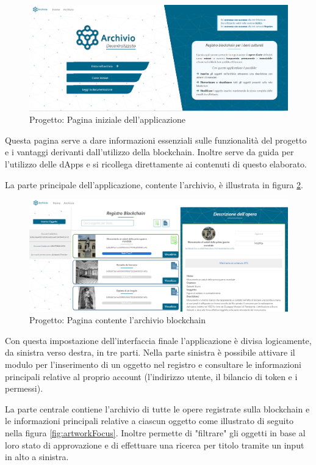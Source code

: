 \begin{figure}[H]
\centering
\includegraphics[width=1\textwidth]{immagini/prova3Index.PNG}
\caption{Progetto: Pagina iniziale dell'applicazione}
\label{fig:indexApp}
\end{figure}

Questa pagina serve a dare informazioni essenziali sulle funzionalità del progetto e i vantaggi derivanti dall'utilizzo della blockchain. Inoltre serve da guida per l'utilizzo delle dApps e si ricollega direttamente ai contenuti di questo elaborato.

La parte principale dell'applicazione, contente l'archivio, è illustrata in figura \ref{fig:artworkApp}.

\begin{figure}[H]
\centering
\includegraphics[width=1\textwidth]{immagini/artwork3Prova.PNG}
\caption{Progetto: Pagina contente l'archivio blockchain}
\label{fig:artworkApp}
\end{figure}

Con questa impostazione dell'interfaccia finale l'applicazione è divisa logicamente, da sinistra verso destra, in tre parti. Nella parte sinistra è possibile attivare il modulo per l'inserimento di un oggetto nel registro e consultare le informazioni principali relative al proprio account (l'indirizzo utente, il bilancio di token e i permessi). 

La parte centrale contiene l'archivio di tutte le opere registrate sulla blockchain e le informazioni principali relative a ciascun oggetto come illustrato di seguito nella figura \ref{fig:artworkFocus}. Inoltre permette di "filtrare" gli oggetti in base al loro stato di approvazione e di effettuare una ricerca per titolo tramite un input in alto a sinistra.

